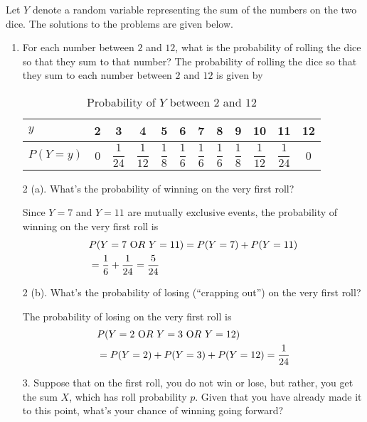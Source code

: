 \documentclass[aps,twocolumn,floatfix, nofootinbib, superscriptaddress]{revtex4-1}
\begin{document}
Let  $Y$ denote a random variable representing the sum of the numbers on the two dice. The solutions to the problems are given below.
\begin{enumerate}
	\item For each number between $2$ and $12$, what is the probability of rolling the dice so that they sum to that number?
	The probability of rolling the dice so that they sum to  each number between $2$ and $12$ is given by
 \begin{table}[ht]
 \caption{Probability of $Y$ between $2$ and $12$}
 \label{tab2}
\centering
    \begin{tabular}{l|ccccccccccc}
    \toprule
    {$y$} &  {2 } &{3}&{4}&{5}&{6}&{7}&{8}&{9}&{10}&{11}&{12} \\  \midrule
   $P(Y=y)$  & {0} &{$\dfrac{1}{24}$}&{$\dfrac{1}{12}$}&{$\dfrac{1}{8}$}&{$\dfrac{1}{6}$}&{$\dfrac{1}{6}$}&{$\dfrac{1}{6}$}&{$\dfrac{1}{8}$}&{$\dfrac{1}{12}$}&{$\dfrac{1}{24}$}&{0} \\  \midrule
    \end{tabular}
    \end{table}
    
    \item[2 (a).] What's the probability of winning on the very first roll?
    
     Since $Y=7$ and $Y =11$ are mutually exclusive events, the probability of winning on the very first roll is
    \begin{align}
    	& P(Y = 7 ~{\text OR}~ Y= 11)   =  
	 P(Y = 7) + P(Y = 11)  \nonumber\\&=  \frac{1}{6} + \frac{1}{24} = \frac{5}{24} 
    \end{align}
    
    \item[2 (b).]What's the probability of losing (``crapping out'') on the very first roll? 
    
    The probability of losing on the very first roll is
    \begin{align}
    	& P(Y = 2 ~{\text OR}~ Y= 3 ~{\text OR}~ Y= 12)  \nonumber\\& = P(Y = 2) + P(Y = 3) + P(Y = 12) = \frac{1}{24} 
    \end{align}
    \item[3.] Suppose that on the first roll, you do not win or lose, but rather, you get the sum $X$, which has roll probability $p$. Given that you have already made it to this point, what's your chance of winning going forward?
    

\end{enumerate}
\end{document}
